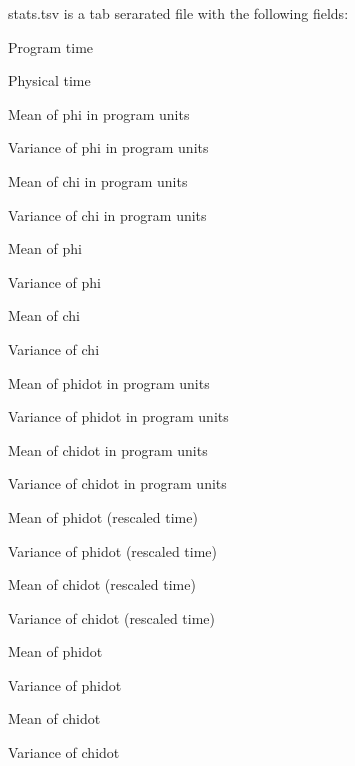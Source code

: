 stats.tsv is a tab serarated file with the following fields:

\begin{DoxyItemize}
\item Program time \item Physical time \item Mean of phi in program units \item Variance of phi in program units \item Mean of chi in program units \item Variance of chi in program units \item Mean of phi \item Variance of phi \item Mean of chi \item Variance of chi \item Mean of phidot in program units \item Variance of phidot in program units \item Mean of chidot in program units \item Variance of chidot in program units \item Mean of phidot (rescaled time) \item Variance of phidot (rescaled time) \item Mean of chidot (rescaled time) \item Variance of chidot (rescaled time) \item Mean of phidot \item Variance of phidot \item Mean of chidot \item Variance of chidot \end{DoxyItemize}
